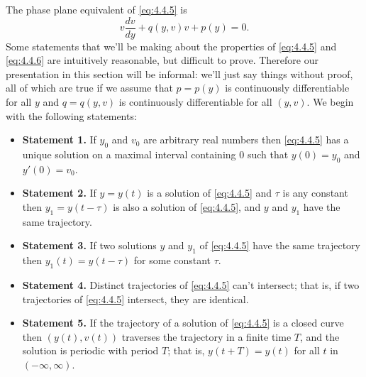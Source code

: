 The phase plane equivalent of \eqref{eq:4.4.5} is
\begin{equation}
  \label{eq:4.4.6}v\frac{dv}{dy}+q(y,v)v+p(y)=0.
\end{equation}
Some statements that we'll be making about the properties of \eqref{eq:4.4.5} and \eqref{eq:4.4.6}
are intuitively reasonable, but difficult to prove. Therefore our presentation in this section will
be informal: we'll just say things without proof, all of which are true if we assume that $p=p(y)$
is continuously differentiable for all $y$ and $q=q(y,v)$ is continuously differentiable for all
$(y,v)$. We begin with the following statements:

\begin{itemize}
  \item {\bf Statement 1.} If $y_{0}$ and $v_{0}$ are arbitrary real numbers then \eqref{eq:4.4.5}
        has a unique solution on a maximal interval containing $0$ such that $y(0)=y_{0}$ and $y'(0)=v_{0}$.

  \item {\bf Statement 2.} If $y=y(t)$ is a solution of \eqref{eq:4.4.5} and $\tau$ is any
        constant then $y_{1}=y(t-\tau)$ is also a solution of \eqref{eq:4.4.5}, and $y$ and
        $y_{1}$ have the same trajectory.

  \item {\bf Statement 3.} If two solutions $y$ and $y_{1}$ of \eqref{eq:4.4.5} have the same
        trajectory then $y_{1}(t)=y(t-\tau)$ for some constant $\tau$.

  \item {\bf Statement 4.} Distinct trajectories of \eqref{eq:4.4.5} can't intersect; that is, if
        two trajectories of \eqref{eq:4.4.5} intersect, they are identical.

  \item {\bf Statement 5.} If the trajectory of a solution of \eqref{eq:4.4.5} is a closed curve
        then $(y(t),v(t))$ traverses the trajectory in a finite time $T$, and the solution is
        periodic with period $T$; that is, $y(t+T)=y(t)$ for all $t$ in $(-\infty,\infty)$.
\end{itemize}

